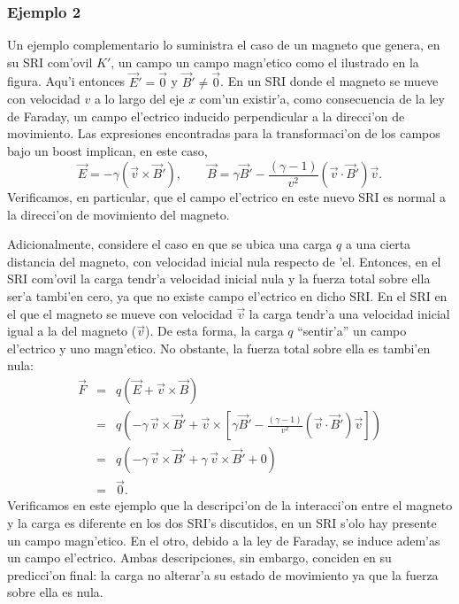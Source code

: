 \subsubsection{Ejemplo 2}
Un ejemplo complementario lo suministra el caso de un magneto que genera, en su SRI com'ovil $K'$, un campo un campo magn'etico como el ilustrado en la figura. Aqu'i entonces $\vec{E}'=\vec{0}$ y $\vec{B}'\neq\vec{0}$. En un SRI donde el magneto se mueve con velocidad $v$ a lo largo del eje $x$ com'un existir'a, como consecuencia de la ley de Faraday, un campo el'ectrico inducido perpendicular a la direcci'on de movimiento. Las expresiones encontradas para la transformaci'on de los campos bajo un boost implican, en este caso,
\begin{equation}
 \vec{E}=-\gamma\left(\vec{v}\times\vec{B}'\right), \qquad
\vec{B}=\gamma \vec{B}'-\frac{(\gamma -1)}{v^2}\left( \vec{v}\cdot
\vec{B}'\right) \vec{v}.
\end{equation}
Verificamos, en particular, que el campo el'ectrico en este nuevo SRI es normal a la direcci'on de movimiento del magneto.

Adicionalmente, considere el caso en que se ubica una carga $q$ a una cierta distancia del magneto, con velocidad inicial nula respecto de 'el. Entonces, en el SRI com'ovil la carga tendr'a velocidad inicial nula y la fuerza total sobre ella ser'a tambi'en cero, ya que no existe campo el'ectrico en dicho SRI. En el SRI en el que el magneto se mueve con velocidad $\vec{v}$ la carga tendr'a una velocidad inicial igual a la del magneto ($\vec{v}$). De esta forma, la carga $q$ ``sentir'a'' un campo el'ectrico y uno magn'etico. No obstante, la fuerza total sobre ella es tambi'en nula:
\begin{eqnarray}
\vec{F}&=&q\left(\vec{E}+\vec{v}\times\vec{B}\right) \\
&=&q\left(-\gamma\,\vec{v}\times\vec{B}'+ \vec{v}\times\left[\gamma \vec{B}'-\frac{(\gamma -1)}{v^2}\left( \vec{v}\cdot
\vec{B}'\right) \vec{v}\right]\right)\\
&=&q\left(-\gamma\, \vec{v}\times\vec{B}'+\gamma\,\vec{v}\times\vec{B}'+0\right)\\
&=&\vec{0}.
\end{eqnarray}
Verificamos en este ejemplo que la descripci'on de la interacci'on entre el magneto y la carga es diferente en los dos SRI's discutidos, en un SRI s'olo hay presente un campo magn'etico. En el otro, debido a la ley de Faraday, se induce adem'as un campo el'ectrico. Ambas descripciones, sin embargo, conciden en su predicci'on final: la carga no alterar'a su estado de movimiento ya que la fuerza sobre ella es nula.


